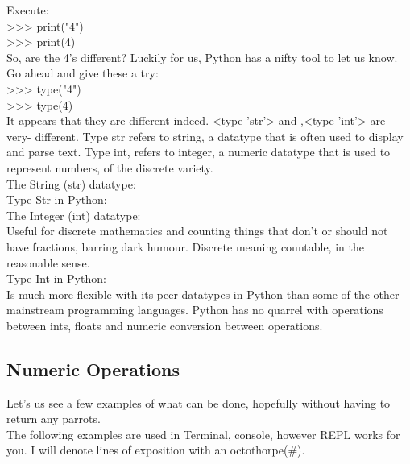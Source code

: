 \documentclass[oneside,12pt]{memoir} %
\begin{document}
Execute:\\
{>}{>}{>} print("4")\\
{>}{>}{>} print(4)\\

So, are the 4's different? Luckily for us, Python has a nifty tool to let us know. Go ahead and give these a try: \\
{>}{>}{>} type("4")\\
{>}{>}{>} type(4)\\


It appears that they are different indeed. <type 'str'> and ,<type 'int'> are -very- different. Type str refers to string, a datatype that is often used to display and parse text. Type int, refers to integer, a numeric datatype that is used to represent numbers, of the discrete variety. \\

The String (str) datatype:\\

Type Str in Python:\\


The Integer (int) datatype:\\

Useful for discrete mathematics and counting things that don't or should not have fractions, barring dark humour. Discrete meaning countable, in the reasonable sense. \\

Type Int in Python:\\
Is much more flexible with its peer datatypes in Python than some of the other mainstream programming languages. Python has no quarrel with operations between ints, floats and numeric conversion between operations. \\



\subsection{Numeric Operations} %
\label{sub:numeric_operations}


Let's us see a few examples of what can be done, hopefully without having to return any parrots. \\
The following examples are used in Terminal, console, however REPL works for you. I will denote lines of exposition with an octothorpe(\#).\\
\end{document}
